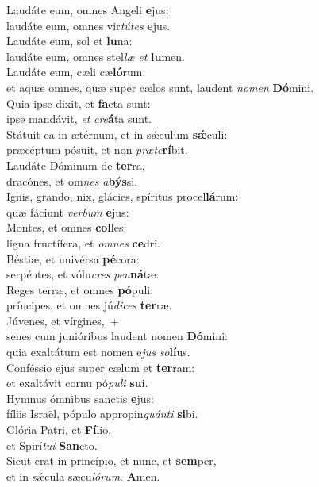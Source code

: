 \evenverse Laudáte eum, omnes Angeli \textbf{e}jus:~\*\\
\evenverse laudáte eum, omnes vir\textit{tú}\textit{tes} \textbf{e}jus.\\
\oddverse Laudáte eum, sol et \textbf{lu}na:~\*\\
\oddverse laudáte eum, omnes stel\textit{læ} \textit{et} \textbf{lu}men.\\
\evenverse Laudáte eum, cæli cæ\textbf{ló}rum:~\*\\
\evenverse et aquæ omnes, quæ super cælos sunt, laudent \textit{no}\textit{men} \textbf{Dó}mini.\\
\oddverse Quia ipse dixit, et \textbf{fa}cta sunt:~\*\\
\oddverse ipse mandávit, \textit{et} \textit{cre}\textbf{á}ta sunt.\\
\evenverse Státuit ea in ætérnum, et in sǽculum \textbf{sǽ}culi:~\*\\
\evenverse præcéptum pósuit, et non \textit{præ}\textit{te}\textbf{rí}bit.\\
\oddverse Laudáte Dóminum de \textbf{ter}ra,~\*\\
\oddverse dracónes, et om\textit{nes} \textit{a}\textbf{býs}si.\\
\evenverse Ignis, grando, nix, glácies, spíritus procel\textbf{lá}rum:~\*\\
\evenverse quæ fáciunt \textit{ver}\textit{bum} \textbf{e}jus:\\
\oddverse Montes, et omnes \textbf{col}les:~\*\\
\oddverse ligna fructífera, et \textit{om}\textit{nes} \textbf{ce}dri.\\
\evenverse Béstiæ, et univérsa \textbf{pé}cora:~\*\\
\evenverse serpéntes, et vólu\textit{cres} \textit{pen}\textbf{ná}tæ:\\
\oddverse Reges terræ, et omnes \textbf{pó}puli:~\*\\
\oddverse príncipes, et omnes jú\textit{di}\textit{ces} \textbf{ter}ræ.\\
\evenverse Júvenes, et vírgines,~+\\
\evenverse  senes cum junióribus laudent nomen \textbf{Dó}mini:~\*\\
\evenverse quia exaltátum est nomen e\textit{jus} \textit{so}\textbf{lí}us.\\
\oddverse Conféssio ejus super cælum et \textbf{ter}ram:~\*\\
\oddverse et exaltávit cornu pó\textit{pu}\textit{li} \textbf{su}i.\\
\evenverse Hymnus ómnibus sanctis \textbf{e}jus:~\*\\
\evenverse fíliis Israël, pópulo appropin\textit{quán}\textit{ti} \textbf{si}bi.\\
\oddverse Glória Patri, et \textbf{Fí}lio,~\*\\
\oddverse et Spirí\textit{tu}\textit{i} \textbf{San}cto.\\
\evenverse Sicut erat in princípio, et nunc, et \textbf{sem}per,~\*\\
\evenverse et in sǽcula sæcu\textit{ló}\textit{rum}. \textbf{A}men.\\
